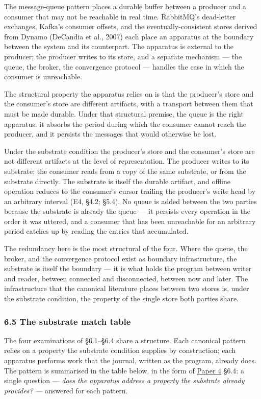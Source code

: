 \documentclass[
]{article}
\begin{document}
The message-queue pattern places a durable buffer between a producer and
a consumer that may not be reachable in real time. RabbitMQ's
dead-letter exchanges, Kafka's consumer offsets, and the
eventually-consistent stores derived from Dynamo (DeCandia et al., 2007)
each place an apparatus at the boundary between the system and its
counterpart. The apparatus is external to the producer; the producer
writes to its store, and a separate mechanism --- the queue, the broker,
the convergence protocol --- handles the case in which the consumer is
unreachable.

The structural property the apparatus relies on is that the producer's
store and the consumer's store are different artifacts, with a transport
between them that must be made durable. Under that structural premise,
the queue is the right apparatus: it absorbs the period during which the
consumer cannot reach the producer, and it persists the messages that
would otherwise be lost.

Under the substrate condition the producer's store and the consumer's
store are not different artifacts at the level of representation. The
producer writes to its substrate; the consumer reads from a copy of the
same substrate, or from the substrate directly. The substrate is itself
the durable artifact, and offline operation reduces to the consumer's
cursor trailing the producer's write head by an arbitrary interval (E4,
§4.2; §5.4). No queue is added between the two parties because the
substrate is already the queue --- it persists every operation in the
order it was uttered, and a consumer that has been unreachable for an
arbitrary period catches up by reading the entries that accumulated.

The redundancy here is the most structural of the four. Where the queue,
the broker, and the convergence protocol exist as boundary
infrastructure, the substrate is itself the boundary --- it is what
holds the program between writer and reader, between connected and
disconnected, between now and later. The infrastructure that the
canonical literature places between two stores is, under the substrate
condition, the property of the single store both parties share.

\subsubsection{6.5 The substrate match
table}\label{the-substrate-match-table}

The four examinations of §6.1--§6.4 share a structure. Each canonical
pattern relies on a property the substrate condition supplies by
construction; each apparatus performs work that the journal, written as
the program, already does. The pattern is summarised in the table below,
in the form of \href{04-cross-actor-continuity.md}{Paper 4} §6.4: a
single question --- \emph{does the apparatus address a property the
substrate already provides?} --- answered for each pattern.
\end{document}

